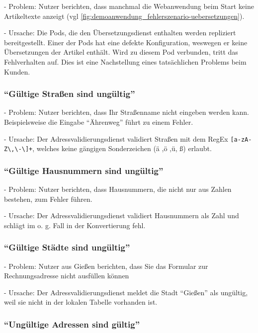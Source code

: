 - Problem: Nutzer berichten, dass manchmal die Webanwendung beim Start keine Artikeltexte anzeigt (vgl \autoref{fig:demoanwendung_fehlerszenario-uebersetzungen}).

- Ursache: Die Pods, die den Übersetzungsdienst enthalten werden repliziert bereitgestellt. Einer der Pods hat eine defekte Konfiguration, weswegen er keine Übersetzungen der Artikel enthält. Wird zu diesem Pod verbunden, tritt das Fehlverhalten auf. Dies ist eine Nachstellung eines tatsächlichen Problems beim Kunden.

\subsubsection{\enquote{Gültige Straßen sind ungültig}}

- Problem: Nutzer berichten, dass Ihr Straßenname nicht eingeben werden kann. Beispielsweise die Eingabe \enquote{Ährenweg} führt zu einem Fehler.

- Ursache: Der Adressvalidierungsdienst validiert Straßen mit dem RegEx \texttt{[a-zA-Z\textbackslash,\textbackslash-\textbackslash ]+}, welches keine gängigen Sonderzeichen (ä ,ö ,ü, ß) erlaubt.

\subsubsection{\enquote{Gültige Hausnummern sind ungültig}}

- Problem: Nutzer berichten, dass Hausnummern, die nicht nur aus Zahlen bestehen, zum Fehler führen.

- Ursache: Der Adressvalidierungsdienst validiert Hausnummern als Zahl und schlägt im o. g. Fall in der Konvertierung fehl.

\subsubsection{\enquote{Gültige Städte sind ungültig}}

- Problem: Nutzer aus Gießen berichten, dass Sie das Formular zur Rechnungsadresse nicht ausfüllen können

- Ursache: Der Adressvalidierungsdienst meldet die Stadt \enquote{Gießen} als ungültig, weil sie nicht in der lokalen Tabelle vorhanden ist.

\subsubsection{\enquote{Ungültige Adressen sind gültig}}
\label{sec:invalid-address-is-valid}

